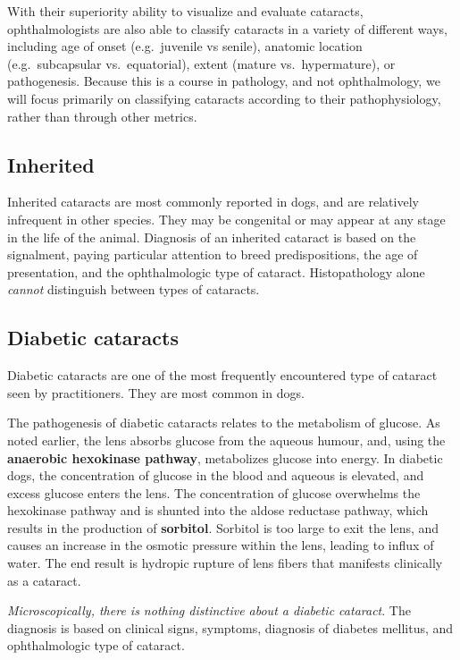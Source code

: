 \documentclass[openany]{book}
\begin{document}
With their superiority ability to visualize and evaluate cataracts,
ophthalmologists are also able to classify cataracts in a variety of
different ways, including age of onset (e.g.~juvenile vs senile),
anatomic location (e.g.~subcapsular vs.~equatorial), extent (mature
vs.~hypermature), or pathogenesis. Because this is a course in
pathology, and not ophthalmology, we will focus primarily on classifying
cataracts according to their pathophysiology, rather than through other
metrics.

\subsection{Inherited}\label{inherited}

Inherited cataracts are most commonly reported in dogs, and are
relatively infrequent in other species. They may be congenital or may
appear at any stage in the life of the animal. Diagnosis of an inherited
cataract is based on the signalment, paying particular attention to
breed predispositions, the age of presentation, and the ophthalmologic
type of cataract. Histopathology alone \emph{cannot} distinguish between
types of cataracts.

\subsection{Diabetic cataracts}\label{diabetic-cataracts}

Diabetic cataracts are one of the most frequently encountered type of
cataract seen by practitioners. They are most common in dogs.

The pathogenesis of diabetic cataracts relates to the metabolism of
glucose. As noted earlier, the lens absorbs glucose from the aqueous
humour, and, using the \textbf{anaerobic hexokinase pathway},
metabolizes glucose into energy. In diabetic dogs, the concentration of
glucose in the blood and aqueous is elevated, and excess glucose enters
the lens. The concentration of glucose overwhelms the hexokinase pathway
and is shunted into the aldose reductase pathway, which results in the
production of \textbf{sorbitol}. Sorbitol is too large to exit the lens,
and causes an increase in the osmotic pressure within the lens, leading
to influx of water. The end result is hydropic rupture of lens fibers
that manifests clinically as a cataract.

\emph{Microscopically, there is nothing distinctive about a diabetic
cataract}. The diagnosis is based on clinical signs, symptoms, diagnosis
of diabetes mellitus, and ophthalmologic type of cataract.
\end{document}
